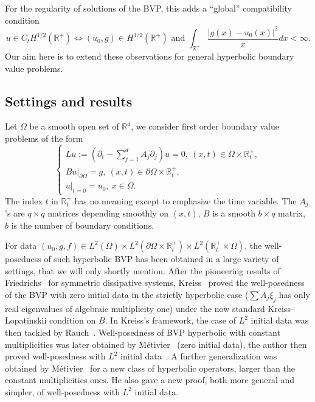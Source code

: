 \documentclass[AHL,Unicode,longabstracts,published]{cedram}
\newcommand{\R}{\mathbb{R}}
\begin{document}
For the regularity of solutions of the BVP, this adds a ``global'' compatibility condition
\[
u\in C_tH^{1/2}(\R^+)\Leftrightarrow (u_0,g)\in H^{1/2}(\R^+)\text{ and }
\int_{\R^+}\frac{|g(x)-u_0(x)|^2}{x}dx<\infty.
\]
Our aim here is to extend these observations for general hyperbolic boundary value problems.

\subsection{Settings and results}

Let $\Omega$ be a smooth open set of $\R^d$, we consider first order boundary value problems of the form
\begin{equation}\label{IBVP}
\begin{cases}
Lu:=\left(\partial_t-\sum_{j=1}^d A_j\partial_j\right)u=0,\ (x,t)\in \Omega\times \R_t^+,\\
Bu|_{\partial\Omega}=g,\ (x,t)\in \partial\Omega\times \R_t^+,\\
u|_{t=0}=u_0,\ x\in \Omega.
\end{cases}
\end{equation}
The index $t$ in $\R_t^+$ has no meaning except to emphasize the time variable. The $A_j$'s are $q\times q$ matrices depending smoothly on $(x,t)$, $B$ is a smooth $b\times q$ matrix, $b$ is the number of boundary conditions.


For data $(u_0,g,f)\in L^2(\Omega)\times L^2(\partial\Omega\times \R_t^+)\times L^2(\R^+_t\times \Omega)$, the well-posedness of such hyperbolic BVP has been obtained in a large variety of settings, that we will only shortly mention. After the pioneering results of Friedrichs~\cite{Friedrichs} for symmetric dissipative systems, Kreiss~\cite{Kreiss} proved the well-posedness of the BVP with zero initial data in the strictly hyperbolic case ($\sum A_j\xi_j$ has only real eigenvalues of algebraic multiplicity one) under the now standard Kreiss--Lopatinskii condition on $B$. In Kreiss's framework, the case of $L^2$ initial data was then tackled by Rauch~\cite{Rauch}. Well-posedness of BVP hyperbolic with constant multiplicities was later obtained by Métivier~\cite{Met} (zero initial data), the author then proved well-posedness with $L^2$ initial data~\cite{Audiard1}. A further generalization was obtained by Métivier~\cite{Metsemigroupe} for a new class of hyperbolic operators, larger than the constant multiplicities ones. He also gave a new proof, both more general and simpler, of well-posedness with $L^2$ initial data.
\end{document}
